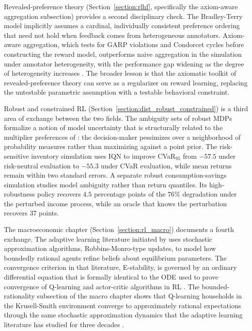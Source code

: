 Revealed-preference theory (Section~\ref{section:rlhf}, specifically the axiom-aware aggregation subsection) provides a second disciplinary check.
The Bradley-Terry model implicitly assumes a cardinal, individually consistent preference ordering that need not hold when feedback comes from heterogeneous annotators.
Axiom-aware aggregation, which tests for GARP violations and Condorcet cycles before constructing the reward model, outperforms naive aggregation in the simulation under annotator heterogeneity, with the performance gap widening as the degree of heterogeneity increases \citep{varian1982nonparametric, skalse2023invariance}.
The broader lesson is that the axiomatic toolkit of revealed-preference theory can serve as a regularizer on reward learning, replacing the untestable parametric assumption with a testable behavioral constraint.

Robust and constrained RL (Section~\ref{section:dist_robust_constrained}) is a third area of exchange between the two fields.
The ambiguity sets of robust MDPs formalize a notion of model uncertainty that is structurally related to the multiplier preferences of \citet{HansenSargent2001}: the decision-maker pessimizes over a neighborhood of probability measures rather than maximizing against a point prior.
The risk-sensitive inventory simulation uses IQN to improve CVaR$_{95}$ from $-57.5$ under risk-neutral evaluation to $-55.3$ under CVaR evaluation, while mean returns remain within two standard errors.
A separate robust consumption-savings simulation studies model ambiguity rather than return quantiles. Its high-robustness policy recovers $4.5$ percentage points of the $76\%$ degradation under the perturbed income process, while an oracle that knows the perturbation recovers $37$ points.

The macroeconomic chapter (Section~\ref{section:rl_macro}) documents a fourth exchange.
The adaptive learning literature initiated by \citet{MarcetSargent1989} uses stochastic approximation algorithms, Robbins-Monro-type updates, to model how boundedly rational agents refine beliefs about equilibrium parameters.
The convergence criterion in that literature, E-stability, is governed by an ordinary differential equation that is formally identical to the ODE used to prove convergence of Q-learning and actor-critic algorithms in RL \citep{borkar2000}.
The bounded-rationality subsection of the macro chapter shows that Q-learning households in the Krusell-Smith environment converge to approximately rational expectations through the same stochastic approximation dynamics that the adaptive learning literature has studied for three decades \citep{KaplanMollViolante2018, MarimonMcGrattanSargent1990}.

